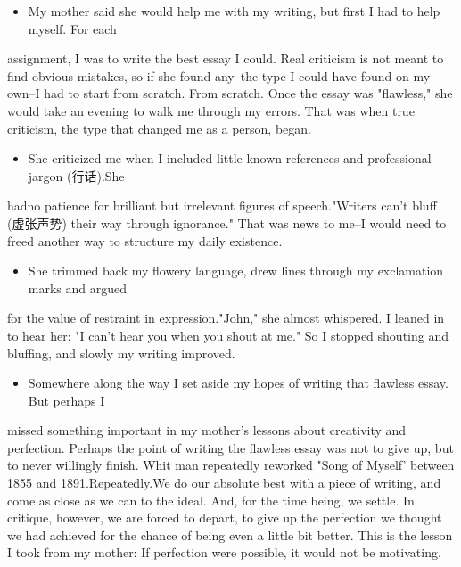 \documentclass[UTF8,11pt]{ctexart}
\begin{document}
\begin{itemize}[leftmargin=2em,itemsep=.2em,topsep=.4em]\item[H.] My mother said she would help me with my writing, but first I had to help myself. For each
\end{itemize}

assignment, I was to write the best essay I could. Real criticism is not meant to find obvious mistakes, so if she found any--the type I could have found on my own--I had to start from scratch. From scratch. Once the essay was "flawless," she would take an evening to walk me through my errors. That was when true criticism, the type that changed me as a person, began.


\begin{itemize}[leftmargin=2em,itemsep=.2em,topsep=.4em]\item[I.] She criticized me when I included little-known references and professional jargon (行话).She
\end{itemize}

hadno patience for brilliant but irrelevant figures of speech."Writers can't bluff (虚张声势) their way through ignorance." That was news to me--I would need to freed another way to structure my daily existence.


\begin{itemize}[leftmargin=2em,itemsep=.2em,topsep=.4em]\item[J.] She trimmed back my flowery language, drew lines through my exclamation marks and argued
\end{itemize}

for the value of restraint in expression."John," she almost whispered. I leaned in to hear her: "I can't hear you when you shout at me." So I stopped shouting and bluffing, and slowly my writing improved.


\begin{itemize}[leftmargin=2em,itemsep=.2em,topsep=.4em]\item[K.] Somewhere along the way I set aside my hopes of writing that flawless essay. But perhaps I
\end{itemize}

missed something important in my mother's lessons about creativity and perfection. Perhaps the point of writing the flawless essay was not to give up, but to never willingly finish. Whit man repeatedly reworked "Song of Myself' between 1855 and 1891.Repeatedly.We do our absolute best with a piece of writing, and come as close as we can to the ideal. And, for the time being, we settle. In critique, however, we are forced to depart, to give up the perfection we thought we had achieved for the chance of being even a little bit better. This is the lesson I took from my mother: If perfection were possible, it would not be motivating.
\end{document}
